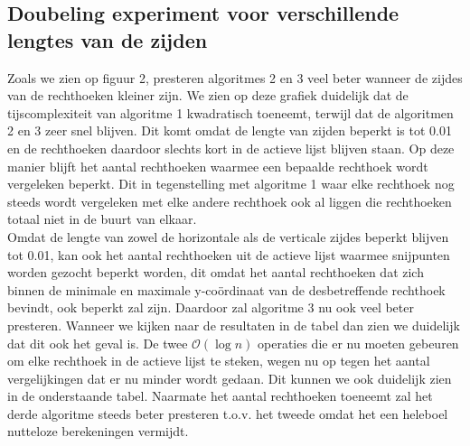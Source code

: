 \documentclass[11pt,a4paper,titlepage]{article}
\begin{document}
		\subsection{Doubeling experiment voor verschillende lengtes van de zijden}
			Zoals we zien op figuur 2, presteren algoritmes 2 en 3 veel beter wanneer de zijdes van de rechthoeken kleiner zijn.  We zien op deze grafiek duidelijk dat de tijscomplexiteit van algoritme 1 kwadratisch toeneemt, terwijl dat de algoritmen 2 en 3 zeer snel blijven. Dit komt omdat de lengte van zijden beperkt is tot 0.01 en de rechthoeken daardoor slechts kort in de actieve lijst blijven staan.  Op deze manier blijft het aantal rechthoeken waarmee een bepaalde rechthoek wordt vergeleken beperkt. Dit in tegenstelling met algoritme 1 waar elke rechthoek nog steeds wordt vergeleken met elke andere rechthoek ook al liggen die rechthoeken totaal niet in de buurt van elkaar. \\
			Omdat de lengte van zowel de horizontale als de verticale zijdes beperkt blijven tot 0.01, kan ook het aantal rechthoeken uit de actieve lijst waarmee snijpunten worden gezocht beperkt worden, dit omdat het aantal rechthoeken dat zich binnen de minimale en maximale y-coördinaat van de desbetreffende rechthoek bevindt, ook beperkt zal zijn. Daardoor zal algoritme 3 nu ook veel beter presteren.  Wanneer we kijken naar de resultaten in de tabel dan zien we duidelijk dat dit ook het geval is. De twee $\mathcal{O}(\log n)$ operaties die er nu moeten gebeuren om elke rechthoek in de actieve lijst te steken, wegen nu op tegen het aantal vergelijkingen dat er nu minder wordt gedaan. Dit kunnen we ook duidelijk zien in de onderstaande tabel. Naarmate het aantal rechthoeken toeneemt zal het derde algoritme steeds beter presteren t.o.v. het tweede omdat het een heleboel nutteloze berekeningen vermijdt.
\end{document}
